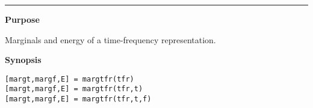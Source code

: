 

\hspace*{-1.6cm}{\Large \bf margtfr}

\vspace*{-.4cm}
\hspace*{-1.6cm}\rule[0in]{16.5cm}{.02cm}
\vspace*{.2cm}



{\bf \large {}\selectfont Purpose}\\
\hspace*{1.5cm}
\begin{minipage}[t]{13.5cm}
Marginals and energy of a time-frequency representation.
\end{minipage}
\vspace*{.2cm}

{\bf \large {}\selectfont Synopsis}\\
\hspace*{1.5cm}
\begin{minipage}[t]{13.5cm}
\begin{verbatim}
[margt,margf,E] = margtfr(tfr)
[margt,margf,E] = margtfr(tfr,t)
[margt,margf,E] = margtfr(tfr,t,f)
\end{verbatim}
\end{minipage}
\vspace*{.3cm}

